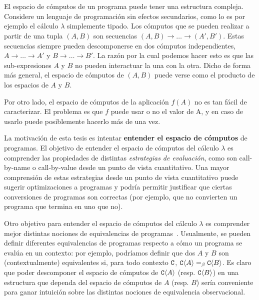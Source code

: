 \section*{}

El espacio de cómputos de un programa puede tener una estructura compleja.
Considere un lenguaje de programación sin efectos secundarios,
como lo es por ejemplo el cálculo $\lambda$ simplemente tipado.
Los cómputos que se pueden realizar a partir de una tupla $(A,B)$
son secuencias $(A, B) \to \hdots \to (A', B')$.
Estas secuencias siempre pueden descomponerse
en dos cómputos independientes,
$A \to \hdots \to A'$ y $B \to \hdots \to B'$.
La razón por la cual podemos hacer esto es que las sub-expresiones $A$ y $B$
no pueden interactuar la una con la otra.
Dicho de forma más general, el espacio de cómputos de $(A,B)$ puede
verse como el producto de los espacios de $A$ y $B$.

Por otro lado, el espacio de cómputos de la aplicación $f(A)$
no es tan fácil de caracterizar.
El problema es que $f$ puede usar o no el valor de A,
y en caso de usarlo puede posiblemente hacerlo más de una vez.


La motivación de esta tesis es intentar \textbf{entender el espacio de cómputos} de programas.
El objetivo de entender el espacio de cómputos del cálculo $\lambda$ es comprender
las propiedades de distintas \textit{estrategias de evaluación},
como son call-by-name o call-by-value desde un punto de vista cuantitativo.
Una mayor comprensión de estas estrategias desde un punto de vista cuantitativo puede
sugerir optimizaciones a programas y podría permitir justificar que
ciertas conversiones de programas son correctas (por ejemplo, que no
convierten un programa que termina en uno que no).

Otro objetivo para entender el espacio de cómputos del cálculo $\lambda$ es comprender mejor
distintas nociones de equivalencias de programas~\cite{Tesis:Morris,Bre16}.
Usualmente, se pueden definir diferentes equivalencias de
programas respecto a cómo un programa se evalúa en un contexto:
por ejemplo,
podríamos definir que dos $A$ y $B$ son (contextualmente) equivalentes
si, para todo contexto $\mathtt{C}$, $\mathtt{C}\langle A\rangle =_{\beta} \mathtt{C}\langle B\rangle$.
Es claro que poder descomponer el espacio de cómputos de $\mathtt{C}\langle A\rangle$ (resp. $\mathtt{C}\langle B\rangle$) en una
estructura que dependa del espacio de cómputos de $A$ (resp. $B$) sería conveniente
para ganar intuición sobre las distintas nociones de equivalencia observacional.

\vspace{1cm}


